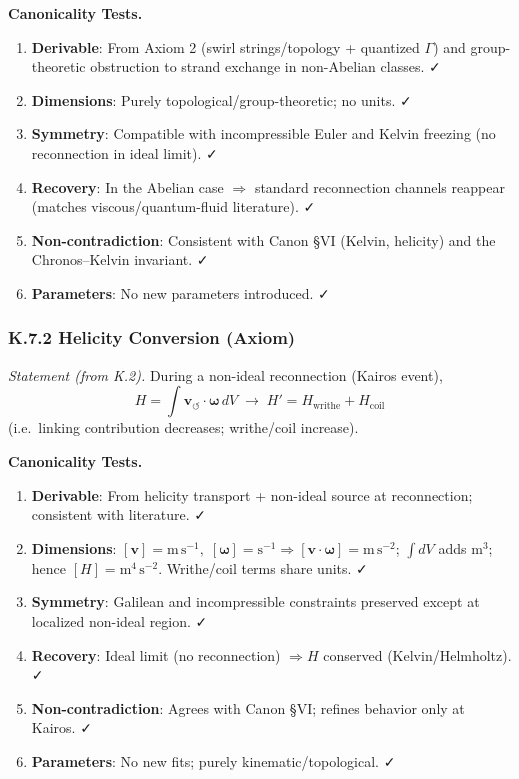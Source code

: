 \documentclass[10pt,reprint,aps,onecolumn,nofootinbib]{revtex4-2}
\begin{document}
    \textbf{Canonicality Tests.}
    \begin{enumerate}
        \item \textbf{Derivable}: From Axiom 2 (swirl strings/topology + quantized $\Gamma$) and group-theoretic obstruction to strand exchange in non-Abelian classes. ✓
        \item \textbf{Dimensions}: Purely topological/group-theoretic; no units. ✓
        \item \textbf{Symmetry}: Compatible with incompressible Euler and Kelvin freezing (no reconnection in ideal limit). ✓
        \item \textbf{Recovery}: In the Abelian case $\Rightarrow$ standard reconnection channels reappear (matches viscous/quantum-fluid literature). ✓
        \item \textbf{Non-contradiction}: Consistent with Canon §VI (Kelvin, helicity) and the Chronos–Kelvin invariant. ✓
        \item \textbf{Parameters}: No new parameters introduced. ✓
    \end{enumerate}

    \subsubsection*{K.7.2 Helicity Conversion (Axiom)}
    \emph{Statement (from K.2).} During a non-ideal reconnection (Kairos event),
    \[
        H=\!\int \mathbf{v}_{\!\boldsymbol{\circlearrowleft}}\!\cdot\!\boldsymbol{\omega}\, dV
        \;\to\; H' = H_{\text{writhe}} + H_{\text{coil}}
    \]
    (i.e.\ linking contribution decreases; writhe/coil increase).

    \textbf{Canonicality Tests.}
    \begin{enumerate}
        \item \textbf{Derivable}: From helicity transport + non-ideal source at reconnection; consistent with literature. ✓
        \item \textbf{Dimensions}: $[\mathbf{v}]=\mathrm{m\,s^{-1}},\; [\boldsymbol{\omega}]=\mathrm{s^{-1}}\Rightarrow [\mathbf{v}\!\cdot\!\boldsymbol{\omega}]=\mathrm{m\,s^{-2}}$; $\int dV$ adds $\mathrm{m^3}$; hence $[H]=\mathrm{m^4\,s^{-2}}$. Writhe/coil terms share units. ✓
        \item \textbf{Symmetry}: Galilean and incompressible constraints preserved except at localized non-ideal region. ✓
        \item \textbf{Recovery}: Ideal limit (no reconnection) $\Rightarrow H$ conserved (Kelvin/Helmholtz). ✓
        \item \textbf{Non-contradiction}: Agrees with Canon §VI; refines behavior only at Kairos. ✓
        \item \textbf{Parameters}: No new fits; purely kinematic/topological. ✓
    \end{enumerate}
\end{document}
